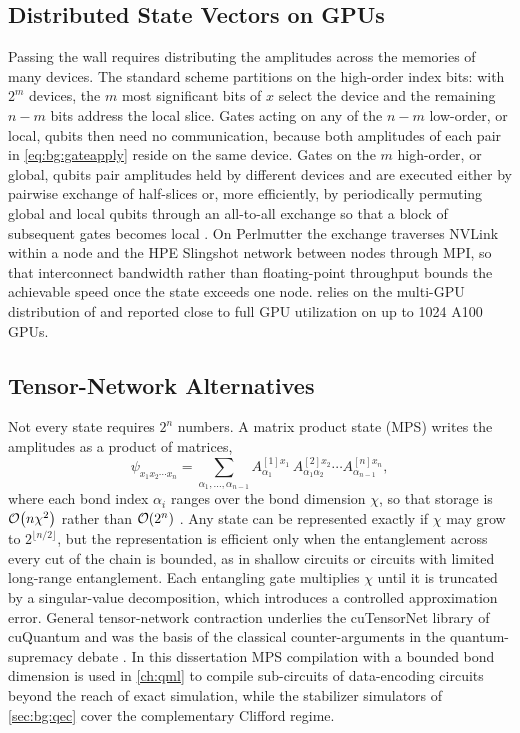 \subsection{Distributed State Vectors on GPUs}

Passing the wall requires distributing the amplitudes across the memories of many devices. The standard scheme partitions on the high-order index bits: with $2^m$ devices, the $m$ most significant bits of $x$ select the device and the remaining $n-m$ bits address the local slice. Gates acting on any of the $n-m$ low-order, or local, qubits then need no communication, because both amplitudes of each pair in \cref{eq:bg:gateapply} reside on the same device. Gates on the $m$ high-order, or global, qubits pair amplitudes held by different devices and are executed either by pairwise exchange of half-slices or, more efficiently, by periodically permuting global and local qubits through an all-to-all exchange so that a block of subsequent gates becomes local \cite{bayraktar2023cuquantum}. On Perlmutter the exchange traverses NVLink within a node and the HPE Slingshot network between nodes through MPI, so that interconnect bandwidth rather than floating-point throughput bounds the achievable speed once the state exceeds one node. \qgear{} \cite{guo2025qgear} relies on the multi-GPU distribution of \cudaq{} and reported close to full GPU utilization on up to 1024 A100 GPUs.

\subsection{Tensor-Network Alternatives}

Not every state requires $2^n$ numbers. A matrix product state (MPS) writes the amplitudes as a product of matrices,
\begin{equation}\label{eq:bg:mps}
\psi_{x_1x_2\cdots x_n}=\sum_{\alpha_1,\dots,\alpha_{n-1}}A^{[1]x_1}_{\alpha_1}\,A^{[2]x_2}_{\alpha_1\alpha_2}\cdots A^{[n]x_n}_{\alpha_{n-1}},
\end{equation}
where each bond index $\alpha_i$ ranges over the bond dimension $\chi$, so that storage is $\mathcal{O}\!\left(n\chi^2\right)$ rather than $\mathcal{O}\!\left(2^n\right)$ \cite{perezgarcia2006mps}. Any state can be represented exactly if $\chi$ may grow to $2^{\lfloor n/2\rfloor}$, but the representation is efficient only when the entanglement across every cut of the chain is bounded, as in shallow circuits or circuits with limited long-range entanglement. Each entangling gate multiplies $\chi$ until it is truncated by a singular-value decomposition, which introduces a controlled approximation error. General tensor-network contraction underlies the cuTensorNet library of cuQuantum \cite{bayraktar2023cuquantum} and was the basis of the classical counter-arguments in the quantum-supremacy debate \cite{arute2019supremacy}. In this dissertation MPS compilation with a bounded bond dimension is used in \cref{ch:qml} to compile sub-circuits of data-encoding circuits beyond the reach of exact simulation, while the stabilizer simulators of \cref{sec:bg:qec} cover the complementary Clifford regime.

